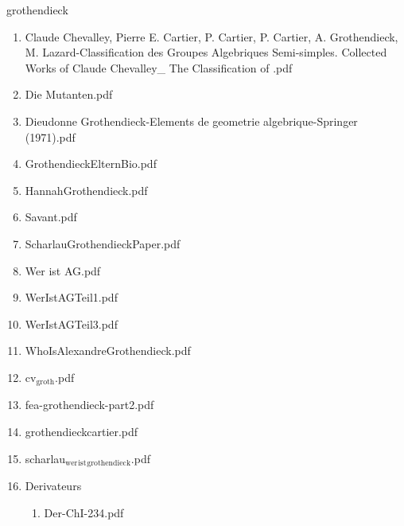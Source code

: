\documentclass[11pt]{article}
\begin{document}
\item grothendieck
\label{sec-1-1-1-1-29-34}
\begin{enumerate}
\item Claude Chevalley, Pierre E. Cartier, P. Cartier, P. Cartier, A. Grothendieck, M. Lazard-Classification des Groupes Algebriques Semi-simples. Collected Works of Claude Chevalley\_ The Classification of .pdf
\label{sec-1-1-1-1-29-34-1}

\item Die Mutanten.pdf
\label{sec-1-1-1-1-29-34-2}

\item Dieudonne Grothendieck-Elements de geometrie algebrique-Springer (1971).pdf
\label{sec-1-1-1-1-29-34-3}

\item GrothendieckElternBio.pdf
\label{sec-1-1-1-1-29-34-4}

\item HannahGrothendieck.pdf
\label{sec-1-1-1-1-29-34-5}

\item Savant.pdf
\label{sec-1-1-1-1-29-34-6}

\item ScharlauGrothendieckPaper.pdf
\label{sec-1-1-1-1-29-34-7}

\item Wer ist AG.pdf
\label{sec-1-1-1-1-29-34-8}

\item WerIstAGTeil1.pdf
\label{sec-1-1-1-1-29-34-9}

\item WerIstAGTeil3.pdf
\label{sec-1-1-1-1-29-34-10}

\item WhoIsAlexandreGrothendieck.pdf
\label{sec-1-1-1-1-29-34-11}

\item cv$_{\text{groth}}$.pdf
\label{sec-1-1-1-1-29-34-12}

\item fea-grothendieck-part2.pdf
\label{sec-1-1-1-1-29-34-13}

\item grothendieckcartier.pdf
\label{sec-1-1-1-1-29-34-14}

\item scharlau$_{\text{wer}}$$_{\text{ist}}$$_{\text{grothendieck}}$.pdf
\label{sec-1-1-1-1-29-34-15}

\item Derivateurs
\label{sec-1-1-1-1-29-34-16}
\begin{enumerate}
\item Der-ChI-234.pdf
\label{sec-1-1-1-1-29-34-16-1}


\end{enumerate}
\end{enumerate}
\end{document}
